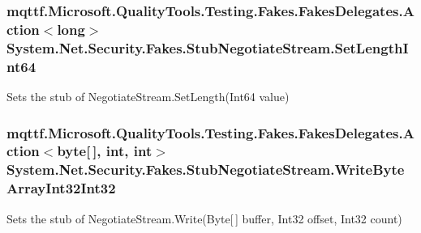 \hypertarget{class_system_1_1_net_1_1_security_1_1_fakes_1_1_stub_negotiate_stream_a1fde6f9da9a3a555fe1cd09ff747edf9}{
\subsubsection[{Set\-Length\-Int64}]{\setlength{\rightskip}{0pt plus 5cm}mqttf.\-Microsoft.\-Quality\-Tools.\-Testing.\-Fakes.\-Fakes\-Delegates.\-Action$<$long$>$ System.\-Net.\-Security.\-Fakes.\-Stub\-Negotiate\-Stream.\-Set\-Length\-Int64}}\label{class_system_1_1_net_1_1_security_1_1_fakes_1_1_stub_negotiate_stream_a1fde6f9da9a3a555fe1cd09ff747edf9}


Sets the stub of Negotiate\-Stream.\-Set\-Length(\-Int64 value)

\hypertarget{class_system_1_1_net_1_1_security_1_1_fakes_1_1_stub_negotiate_stream_a9f783718b6f4ff2f160ba6df2375b6d7}{
\subsubsection[{Write\-Byte\-Array\-Int32\-Int32}]{\setlength{\rightskip}{0pt plus 5cm}mqttf.\-Microsoft.\-Quality\-Tools.\-Testing.\-Fakes.\-Fakes\-Delegates.\-Action$<$byte\mbox{[}$\,$\mbox{]}, int, int$>$ System.\-Net.\-Security.\-Fakes.\-Stub\-Negotiate\-Stream.\-Write\-Byte\-Array\-Int32\-Int32}}\label{class_system_1_1_net_1_1_security_1_1_fakes_1_1_stub_negotiate_stream_a9f783718b6f4ff2f160ba6df2375b6d7}


Sets the stub of Negotiate\-Stream.\-Write(\-Byte\mbox{[}$\,$\mbox{]} buffer, Int32 offset, Int32 count)

